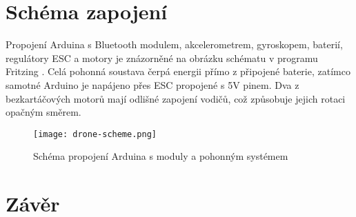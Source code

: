 \documentclass[12pt]{report}
\begin{document}
\chapter[Schéma zapojení]{Schéma zapojení}
Propojení Arduina s Bluetooth modulem, akcelerometrem, gyroskopem, baterií, regulátory ESC a motory je znázorněné na obrázku schématu v programu Fritzing \cite{fritzing}. Celá pohonná soustava čerpá energii přímo z připojené baterie, zatímco samotné Arduino je napájeno přes ESC propojené s 5V pinem. Dva z bezkartáčových motorů mají odlišné zapojení vodičů, což způsobuje jejich rotaci opačným směrem.

\vspace{40pt}
\begin{figure}[H]
	\centering
	\texttt{[image: drone-scheme.png]}
	\caption{Schéma propojení Arduina s moduly a pohonným systémem}
	\label{fig:drone-scheme.png}
\end{figure}

\chapter*{Závěr}
	
\lipsum[1]
	
\nocite{*}
\printbibliography					%
\printglossary[title={Zkratky}]		%
\listoffigures						%
\end{document}
